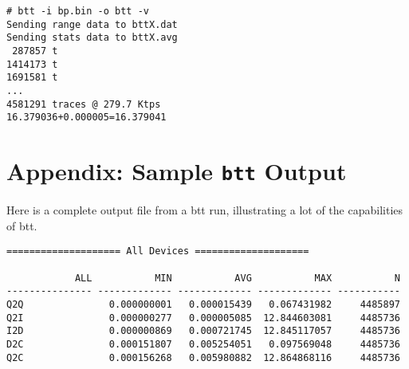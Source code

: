 \documentclass{article}
\begin{document}
\begin{verbatim}
# btt -i bp.bin -o btt -v
Sending range data to bttX.dat
Sending stats data to bttX.avg
 287857 t
1414173 t
1691581 t
...
4581291 traces @ 279.7 Ktps
16.379036+0.000005=16.379041
\end{verbatim}

\newpage\section*{\label{sec:appendix}Appendix: Sample \texttt{btt}
Output}
  
  Here is a complete output file from a btt run, illustrating a lot of the
  capabilities of btt.

\begin{verbatim}
==================== All Devices ====================

            ALL           MIN           AVG           MAX           N
--------------- ------------- ------------- ------------- -----------
Q2Q               0.000000001   0.000015439   0.067431982     4485897
Q2I               0.000000277   0.000005085  12.844603081     4485736
I2D               0.000000869   0.000721745  12.845117057     4485736
D2C               0.000151807   0.005254051   0.097569048     4485736
Q2C               0.000156268   0.005980882  12.864868116     4485736

\end{verbatim}
\end{document}
